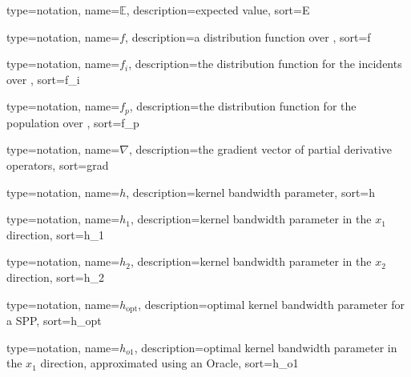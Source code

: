 

{%
   type=notation,
   name={\ensuremath{\mathbb{E}}},
   description={expected value},
   sort={E}
}

{%
   type=notation,
   name={\ensuremath{f}},
   description={a distribution function over },
   sort={f}
}

{%
   type=notation,
   name={\ensuremath{f_i}},
   description={the distribution function for the incidents over },
   sort={f_i}
}

{%
   type=notation,
   name={\ensuremath{f_p}},
   description={the distribution function for the population over },
   sort={f_p}
}

{%
   type=notation,
   name={\ensuremath{\nabla}},
   description={the gradient vector of partial derivative operators},
   sort={grad}
}

{%
   type=notation,
   name={\ensuremath{h}},
   description={kernel bandwidth parameter},
   sort={h}
}

{%
   type=notation,
   name={\ensuremath{h_1}},
   description={kernel bandwidth parameter in the \ensuremath{x_1} direction},
   sort={h_1}
}

{%
   type=notation,
   name={\ensuremath{h_2}},
   description={kernel bandwidth parameter in the \ensuremath{x_2} direction},
   sort={h_2}
}

{%
   type=notation,
   name={\ensuremath{h_{\mbox{opt}}}},
   description={optimal kernel bandwidth parameter for a SPP},
   sort={h_opt}
}

{%
   type=notation,
   name={\ensuremath{h_{o1}}},
   description={optimal kernel bandwidth parameter in the \ensuremath{x_1} direction, approximated using an Oracle},
   sort={h_o1}
}

